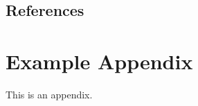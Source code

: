 \documentclass[11pt]{article}
\begin{document}
\subsection{References}



\appendix

\section{Example Appendix}
\label{sec:appendix}

This is an appendix.
\end{document}

